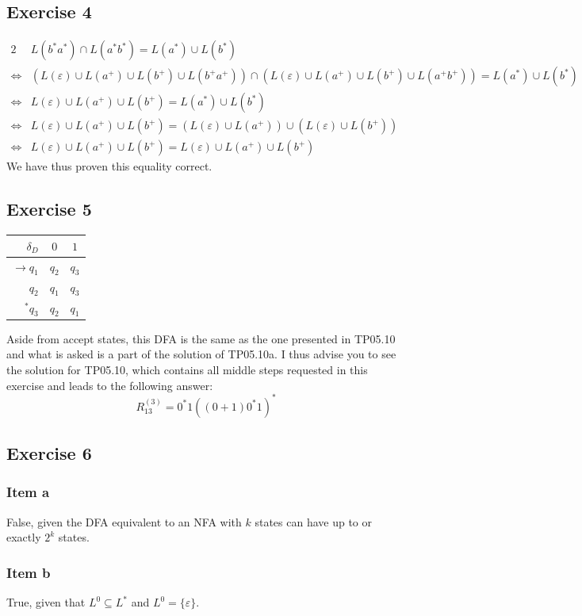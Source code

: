 {\subsection{Exercise 4}
\begin{alignat*}{2}
	     & L(b^*a^*)\cap L(a^*b^*) = L(a^*) \cup L(b^*)\\
	\iff & (L(\varepsilon) \cup L(a^+) \cup L(b^+) \cup L(b^+a^+))\cap (L(\varepsilon) \cup L(a^+) \cup L(b^+) \cup L(a^+b^+)) = L(a^*) \cup L(b^*)\\
	\iff & L(\varepsilon) \cup L(a^+) \cup L(b^+) = L(a^*) \cup L(b^*)\\
	\iff & L(\varepsilon) \cup L(a^+) \cup L(b^+) = (L(\varepsilon)\cup L(a^+)) \cup (L(\varepsilon)\cup L(b^+))\\
	\iff & L(\varepsilon) \cup L(a^+) \cup L(b^+) = L(\varepsilon)\cup L(a^+) \cup L(b^+)
\end{alignat*}
We have thus proven this equality correct.
\subsection{Exercise 5}
\begin{center} \begin{tabular}{r | c c}
	$\delta_D       $ & $0  $ & $1  $ \\ \hline
	$\rightarrow q_1$ & $q_2$ & $q_3$\\
	$            q_2$ & $q_1$ & $q_3$\\
	$         ^* q_3$ & $q_2$ & $q_1$
\end{tabular} \end{center}
Aside from accept states, this DFA is the same as the one presented in TP05.10 and what is asked is a part of the solution of TP05.10a. I thus advise you to see the solution for TP05.10, which contains all middle steps requested in this exercise and leads to the following answer:
\begin{equation*}
	R_{13}^{(3)} = 0^*1((0+1)0^*1)^*
\end{equation*}
\subsection{Exercise 6}
\subsubsection{Item a}
False, given the DFA equivalent to an NFA with $k$ states can have up to or exactly $2^k$ states.
\subsubsection{Item b}
True, given that $L^0 \subseteq L^*$ and $L^0=\{\varepsilon\}$.
}
